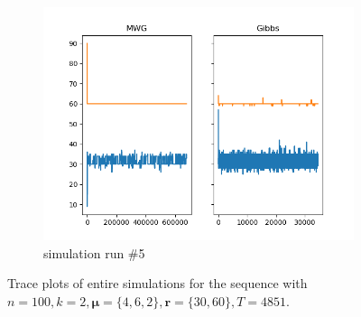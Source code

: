 \begin{figure}[H]
\begin{subfigure}{.3\textwidth}
    	\includegraphics[width=\linewidth]{../../plots/Trace_M3_N100_NMCMC3_seed4_diffind2.png}
    	\caption{simulation run \#5}
	\end{subfigure}
	\caption{Trace plots of entire simulations for the sequence with $n=100, k=2, \bm{\mu} = \{4,6,2\}, \bm{r} = \{30, 60\}, T=4851$.}
\end{figure}

